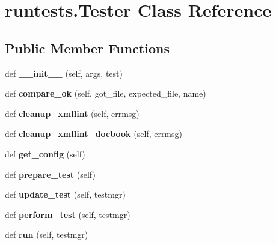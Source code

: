 \hypertarget{classruntests_1_1_tester}{}\section{runtests.\+Tester Class Reference}
\label{classruntests_1_1_tester}
\subsection*{Public Member Functions}
\begin{DoxyCompactItemize}
\item 
\mbox{\label{classruntests_1_1_tester_ad5e72ca051979d7f9c4511c7f27c378c}} 
def {\bfseries \+\_\+\+\_\+init\+\_\+\+\_\+} (self, args, test)
\item 
\mbox{\label{classruntests_1_1_tester_abc690aae1ac5c0f486c76405b4408792}} 
def {\bfseries compare\+\_\+ok} (self, got\+\_\+file, expected\+\_\+file, name)
\item 
\mbox{\label{classruntests_1_1_tester_aa487124052cc077fedb7cc82bb1011a4}} 
def {\bfseries cleanup\+\_\+xmllint} (self, errmsg)
\item 
\mbox{\label{classruntests_1_1_tester_ac9143de0c165934c3833c8d5642a4ea2}} 
def {\bfseries cleanup\+\_\+xmllint\+\_\+docbook} (self, errmsg)
\item 
\mbox{\label{classruntests_1_1_tester_a11b3b5c4d9c0855c324950a52cdb1c75}} 
def {\bfseries get\+\_\+config} (self)
\item 
\mbox{\label{classruntests_1_1_tester_a1e92d475715e50bb0d2895db18f4fe8f}} 
def {\bfseries prepare\+\_\+test} (self)
\item 
\mbox{\label{classruntests_1_1_tester_acf7563910fc9317a3bde6840acb58e52}} 
def {\bfseries update\+\_\+test} (self, testmgr)
\item 
\mbox{\label{classruntests_1_1_tester_aa7c58b411cd7b70ffcedd8c740963aa6}} 
def {\bfseries perform\+\_\+test} (self, testmgr)
\item 
\mbox{\label{classruntests_1_1_tester_a1a71a3c6a381cbba41110bb119898983}} 
def {\bfseries run} (self, testmgr)
\end{DoxyCompactItemize}
